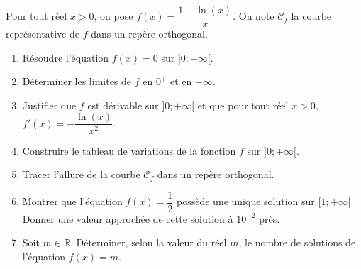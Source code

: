 \documentclass[11pt,fleqn, openany]{book} %
\begin{document}
\begin{exercise}[topic=log03]Pour tout réel $x>0$, on pose $f(x)=\dfrac{1+\ln(x)}{x}$.
On note $\mathcal{C}_f$ la courbe représentative de $f$ dans un repère orthogonal.
\begin{enumerate}
\item Résoudre l'équation $f(x)=0$ sur $]0;+\infty[$.
\item Déterminer les limites de $f$ en $0^+$ et en $+\infty$.
\item Justifier que $f$ est dérivable sur $]0;+\infty[$ et que pour tout réel $x>0$, $f'(x)=-\dfrac{\ln(x)}{x^2}$.
\item Construire le tableau de variations de la fonction $f$ sur $]0;+\infty[$. 
\item Tracer l'allure de la courbe $\mathcal{C}_f$ dans un repère orthogonal.
\item Montrer que l'équation $f(x)=\dfrac{1}{2}$ possède une unique solution sur $[1;+\infty[$. Donner une valeur approchée de cette solution à $10^{-2}$ près.
\item Soit $m \in \mathbb{R}$. Déterminer, selon la valeur du réel $m$, le nombre de solutions de l'équation $f(x)=m$.
\end{enumerate}
\end{exercise}
\end{document}
